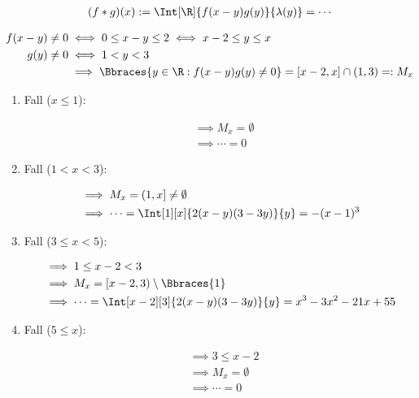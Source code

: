 \begin{solution}

\phantom{}

\begin{align*}
    (f \ast g)(x)
    :=
    \Int[\R]
    {
        f(x - y) g(y)
    }{\lambda(y)}
    =
    \cdots
\end{align*}

\begin{align*}
    f(x - y) \neq 0
    & \iff
    0 \leq x - y \leq 2
    \iff
    x - 2 \leq y \leq x \\
    g(y) \neq 0
    & \iff
    1 < y < 3 \\
    & \implies
    \Bbraces{y \in \R: f(x - y) g(y) \neq 0}
    =
    [x - 2, x] \cap (1, 3)
    =:
    M_x
\end{align*}

\begin{enumerate}[label = \arabic*.]

    \item Fall ($x \leq 1$):
    
    \begin{align*}
        & \implies
        M_x = \emptyset \\
        & \implies
        \cdots = 0
    \end{align*}

    \item Fall ($1 < x < 3$):

    \begin{align*}
        & \implies
        M_x = (1, x] \neq \emptyset \\
        & \implies
        \cdots = \Int[1][x]{2 (x - y) (3 - 3 y)}{y} = -(x - 1)^3
    \end{align*}

    \item Fall ($3 \leq x < 5$):

    \begin{align*}
        & \implies
        1 \leq x - 2 < 3 \\
        & \implies
        M_x = [x - 2, 3) \setminus \Bbraces{1} \\
        & \implies
        \cdots = \Int[x-2][3]{2 (x - y) (3 - 3 y)}{y} = x^3 - 3 x^2 - 21 x + 55
    \end{align*}

    \item Fall ($5 \leq x$):

    \begin{align*}
        & \implies
        3 \leq x - 2 \\
        & \implies
        M_x = \emptyset \\
        & \implies
        \cdots = 0
    \end{align*}

\end{enumerate}

\end{solution}

